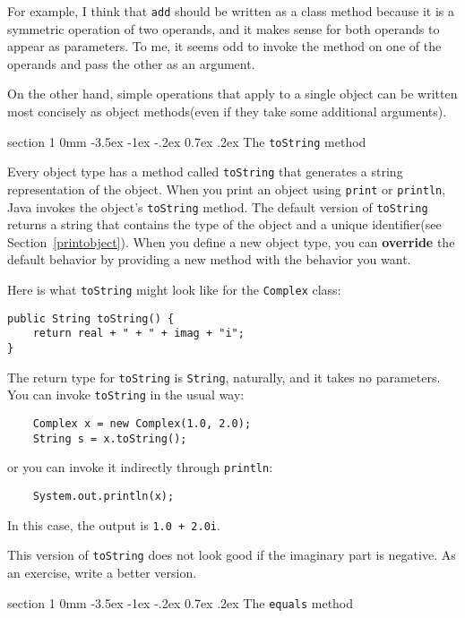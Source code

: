 \documentclass{book}
\makeatletter
\renewcommand{\section}{\@startsection 
    {section} {1} {0mm}%
    {-3.5ex \@plus -1ex \@minus -.2ex}%
    {0.7ex \@plus.2ex}%
    {\normalfont\Large\bfseries}}
\makeatother
\begin{document}
For example, I think that {\tt add} should be written as a class
method because it is a symmetric operation of two operands, and
it makes sense for both operands to appear as parameters.  To me, it
seems odd to invoke the method on one of the operands and pass
the other as an argument.

On the other hand, simple operations that apply to a single object
can be written most concisely as object methods(even if they
take some additional arguments).


\section{The {\tt toString} method}

Every object type has a method called {\tt toString} that generates
a string representation of the object.
When you print an object using {\tt print} or {\tt println},
Java invokes the object's {\tt toString} method.  The default
version of {\tt toString} returns a string that contains the type
of the object and a unique identifier(see Section~\ref{printobject}).
When you define a new object
type, you can {\bf override} the default behavior by providing a
new method with the behavior you want.

Here is what {\tt toString} might look like for the {\tt Complex}
class:

\begin{verbatim}
public String toString() {
    return real + " + " + imag + "i";
}
\end{verbatim}
%
The return type for {\tt toString} is {\tt String}, naturally,
and it takes no parameters.  You can invoke {\tt toString} in
the usual way:

\begin{verbatim}
    Complex x = new Complex(1.0, 2.0);
    String s = x.toString();
\end{verbatim}
%
or you can invoke it indirectly through {\tt println}:

\begin{verbatim}
    System.out.println(x);
\end{verbatim}
%
In this case, the output is {\tt 1.0 + 2.0i}.

This version of {\tt toString} does not look good if the imaginary
part is negative.  As an exercise, write a better version.


\section{The {\tt equals} method}
\end{document}
